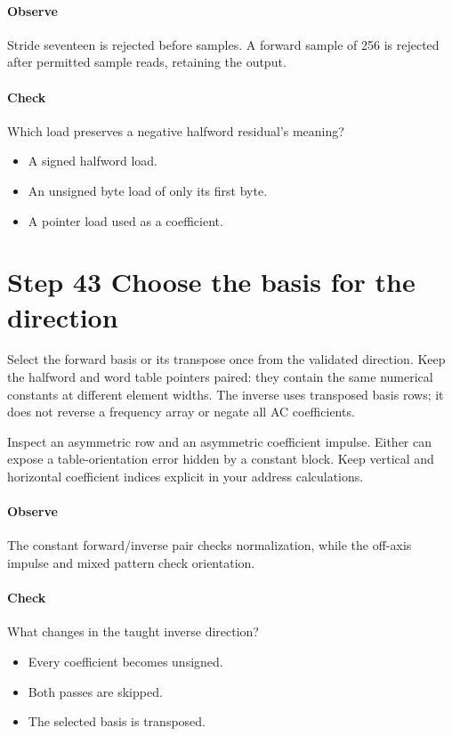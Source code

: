 \paragraph{Observe} Stride seventeen is rejected before samples. A forward
sample of 256 is rejected after permitted sample reads, retaining the output.
\paragraph{Check} Which load preserves a negative halfword residual's meaning?
\begin{itemize}
  \item[A.] A signed halfword load.
  \item[B.] An unsigned byte load of only its first byte.
  \item[C.] A pointer load used as a coefficient.
\end{itemize}

\section{Step 43 Choose the basis for the direction}\label{h263-transform-s03}
Select the forward basis or its transpose once from the validated direction.
Keep the halfword and word table pointers paired: they contain the same numerical
constants at different element widths. The inverse uses transposed basis rows;
it does not reverse a frequency array or negate all AC coefficients.

Inspect an asymmetric row and an asymmetric coefficient impulse. Either can
expose a table-orientation error hidden by a constant block. Keep vertical and
horizontal coefficient indices explicit in your address calculations.

\paragraph{Observe} The constant forward/inverse pair checks normalization,
while the off-axis impulse and mixed pattern check orientation.
\paragraph{Check} What changes in the taught inverse direction?
\begin{itemize}
  \item[A.] Every coefficient becomes unsigned.
  \item[B.] Both passes are skipped.
  \item[C.] The selected basis is transposed.
\end{itemize}

